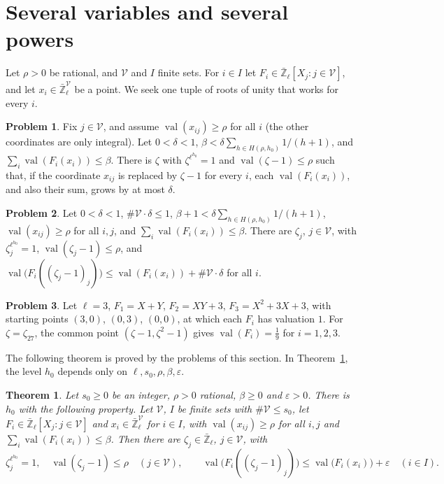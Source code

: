 \documentclass[reqno]{amsart}
\theoremstyle{definition}
\newtheorem{problem}{Problem}[section]
\theoremstyle{plain}
\newtheorem{theorem}{Theorem}[section]
\newcommand{\Zl}{\bar{\mathbb{Z}}_\ell}
\newcommand{\val}{\operatorname{val}}
\begin{document}
\section{Several variables and several powers}\label{sec:several}

Let \(\rho > 0\) be rational, and \(\mathcal V\) and \(I\) finite sets.  For \(i \in I\) let \(F_i \in \Zl[X_j : j \in \mathcal V]\), and let \(x_i \in \Zl^\mathcal V\) be a point.  We seek one tuple of roots of unity that works for every \(i\).

\begin{problem}\label{pr:one-coordinate}
Fix \(j \in \mathcal V\), and assume \(\val(x_{ij}) \ge \rho\) for all \(i\) (the other coordinates are only integral).  Let \(0 < \delta < 1\), \(\beta < \delta\sum_{h \in H(\rho, h_0)} 1/(h + 1)\), and \(\sum_i \val(F_i(x_i)) \le \beta\).  There is \(\zeta\) with \(\zeta^{\ell^{h_0}} = 1\) and \(\val(\zeta - 1) \le \rho\) such that, if the coordinate \(x_{ij}\) is replaced by \(\zeta - 1\) for every \(i\), each \(\val(F_i(x_i))\), and also their sum, grows by at most \(\delta\).
\end{problem}

\begin{problem}\label{pr:all-coordinates}
Let \(0 < \delta < 1\), \(\#\mathcal V \cdot \delta \le 1\), \(\beta + 1 < \delta\sum_{h \in H(\rho, h_0)} 1/(h + 1)\), \(\val(x_{ij}) \ge \rho\) for all \(i, j\), and \(\sum_i \val(F_i(x_i)) \le \beta\).  There are \(\zeta_j\), \(j \in \mathcal V\), with \(\zeta_j^{\ell^{h_0}} = 1\), \(\val(\zeta_j - 1) \le \rho\), and \(\val\bigl(F_i((\zeta_j - 1)_j)\bigr) \le \val(F_i(x_i)) + \#\mathcal V\cdot\delta\) for all \(i\).
\end{problem}

\begin{problem}\label{pr:two-coordinates}
Let \(\ell = 3\), \(F_1 = X + Y\), \(F_2 = XY + 3\), \(F_3 = X^2 + 3X + 3\), with starting points \((3, 0)\), \((0, 3)\), \((0, 0)\), at which each \(F_i\) has valuation \(1\).  For \(\zeta = \zeta_{27}\), the common point \((\zeta - 1, \zeta^2 - 1)\) gives \(\val(F_i) = \tfrac19\) for \(i = 1, 2, 3\).
\end{problem}

The following theorem is proved by the problems of this section.  In Theorem~\ref{thm:roots}, the level \(h_0\) depends only on \(\ell, s_0, \rho, \beta, \varepsilon\).

\begin{theorem}\label{thm:roots}
Let \(s_0 \ge 0\) be an integer, \(\rho > 0\) rational, \(\beta \ge 0\) and \(\varepsilon > 0\).  There is \(h_0\) with the following property.  Let \(\mathcal V\), \(I\) be finite sets with \(\#\mathcal V \le s_0\), let \(F_i \in \Zl[X_j : j \in \mathcal V]\) and \(x_i \in \Zl^\mathcal V\) for \(i \in I\), with \(\val(x_{ij}) \ge \rho\) for all \(i, j\) and \(\sum_i \val(F_i(x_i)) \le \beta\).  Then there are \(\zeta_j \in \Zl\), \(j \in \mathcal V\), with
\[
  \zeta_j^{\ell^{h_0}} = 1,\quad \val(\zeta_j-1)\le\rho
     \quad(j\in\mathcal V),\qquad
  \val\bigl(F_i((\zeta_j-1)_j)\bigr)
     \le \val\bigl(F_i(x_i)\bigr)+\varepsilon \quad(i\in I).
\]
\end{theorem}
\end{document}

